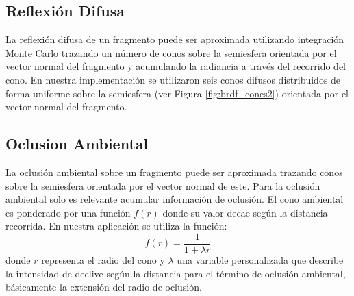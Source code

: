 \subsection{Reflexión Difusa}
La reflexión difusa de un fragmento puede ser aproximada utilizando integración Monte Carlo trazando un número de conos sobre la semiesfera orientada por el vector normal del fragmento y acumulando la radiancia a través del recorrido del cono. En nuestra implementación se utilizaron seis conos difusos distribuidos de forma uniforme sobre la semiesfera (ver Figura \ref{fig:brdf_cones2}) orientada por el vector normal del fragmento.
\subsection{Oclusion Ambiental}
\label{sub:occl_ambt_prop}
La oclusión ambiental sobre un fragmento puede ser aproximada trazando conos sobre la semiesfera orientada por el vector normal de este. Para la oclusión ambiental solo es relevante acumular información de oclusión. El cono ambiental es ponderado por una función $f(r)$ donde su valor decae según la distancia recorrida. En nuestra aplicación se utiliza la función:
\begin{equation}
	f(r) = \frac{1}{1+\lambda r}
\end{equation} donde $r$ representa el radio del cono y $\lambda$ una variable personalizada que describe la intensidad de declive según la distancia para el término de oclusión ambiental, básicamente la extensión del radio de oclusión.

